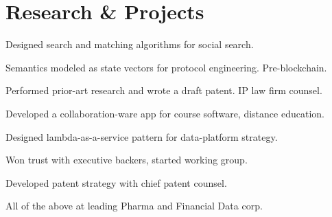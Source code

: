 \documentclass[letterpaper]{deedy-resume} %
\begin{document}
\hfill
\begin{minipage}[t]{1\textwidth} %


\section{Research \& Projects}



\begin{tightitemize}
\item Designed search and matching algorithms for social search.
\item Semantics modeled as state vectors for protocol engineering.  Pre-blockchain.
\item Performed prior-art research and wrote a draft patent. IP law firm counsel.
\item Developed a collaboration-ware app for course software, distance education.
\end{tightitemize}

\sectionspace %




\vspace{\topsep} %
\begin{tightitemize}
\item Designed lambda-as-a-service pattern for data-platform strategy.
\item Won trust with executive backers, started working group.
\item Developed patent strategy with chief patent counsel.
\item All of the above at leading Pharma and Financial Data corp.
\end{tightitemize}

\sectionspace %



\end{minipage}
\end{document}
